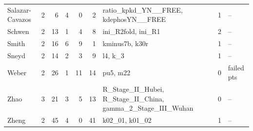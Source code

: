 \begin{longtable}{@{}lrrrrr>{\raggedright}p{2.5cm}r>{\raggedright\arraybackslash}p{2.3cm}@{}}
Salazar-Cavazos & 2 & 6 & 4 & 0 & 2 & ratio\_\allowbreak{}kpkd\_\allowbreak{}YN\_\allowbreak{}\_\allowbreak{}FREE, kdephosYN\_\allowbreak{}\_\allowbreak{}FREE & 1 & -- \\
Schwen & 2 & 13 & 1 & 4 & 8 & ini\_\allowbreak{}R2fold, ini\_\allowbreak{}R1 & 2 & -- \\
Smith & 2 & 16 & 6 & 9 & 1 & kminus7b, k30r & 1 & -- \\
Sneyd & 2 & 14 & 2 & 3 & 9 & l4, k\_\allowbreak{}3 & 1 & -- \\
Weber & 2 & 26 & 1 & 11 & 14 & pu5, m22 & 0 & 2 failed pts \\
Zhao & 3 & 21 & 3 & 5 & 13 & R\_\allowbreak{}Stage\_\allowbreak{}II\_\allowbreak{}Hubei, R\_\allowbreak{}Stage\_\allowbreak{}II\_\allowbreak{}China, gamma\_\allowbreak{}2\_\allowbreak{}Stage\_\allowbreak{}III\_\allowbreak{}Wuhan & 0 & -- \\
Zheng & 2 & 45 & 4 & 0 & 41 & k02\_\allowbreak{}01, k01\_\allowbreak{}02 & 1 & -- \\
\bottomrule
\end{longtable}
